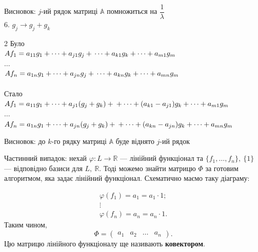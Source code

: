 \documentclass{math_library}
\begin{document}
	Висновок: $j$-ий рядок матриці $\mathbb{A}$ помножиться на $\dfrac{1}{\lambda}$
	\bigskip \\
	6. $g_j \rightarrow g_j + g_k$
	\multicolsep=0pt
	\begin{multicols}{2}
	Було \\
	$Af_1 = a_{11}g_1 + \dots + a_{j1}g_j + \\ \dots + a_{k1}g_k + \dots + a_{m1}g_m$\\
	$\dots$\\
	$Af_n = a_{1n}g_1 + \dots + a_{jn}g_j + \\ \dots + a_{kn}g_k + \dots + a_{mn}g_m$\\
	\columnbreak
	\\
	Стало \\
	$Af_1 = a_{11}g_1 + \dots + a_{j1}(g_j+g_k) + \\ + \dots + (a_{k1}-a_{j1})g_k + \dots + a_{m1}g_m$\\
	$\dots$\\
	$Af_n = a_{1n}g_1 + \dots + a_{jn}(g_j+g_k) + \\ + \dots + (a_{kn}-a_{jn})g_k + \dots + a_{mn}g_m$
	\end{multicols}
	Висновок: до $k$-го рядку матриці $\mathbb{A}$ буде віднято $j$-ий рядок
	\fi
	
	Частинний випадок: нехай $\varphi \colon L \to \mathbb{R}$ --- лінійний функціонал та $\{f_1,\dots,f_n\},\ \{1\}$ --- відповідно базиси для $L,\ \mathbb{R}$. Тоді можемо знайти матрицю $\Phi$ за готовим алгоритмом, яка задає лінійний функціонал. Схематично маємо таку діаграму:
	\begin{center}
	\end{center}
\begin{align*}
\varphi(f_1) = a_1 = a_1 \cdot 1; \\
\vdots \\
\varphi(f_n) = a_n = a_n \cdot 1.
\end{align*}
Таким чином,
\[
\Phi = \begin{pmatrix} a_1 & a_2 & \dots & a_n \end{pmatrix}.
\]
Цю матрицю лінійного функціоналу ще називають \textbf{ковектором}.
	
\end{document}
